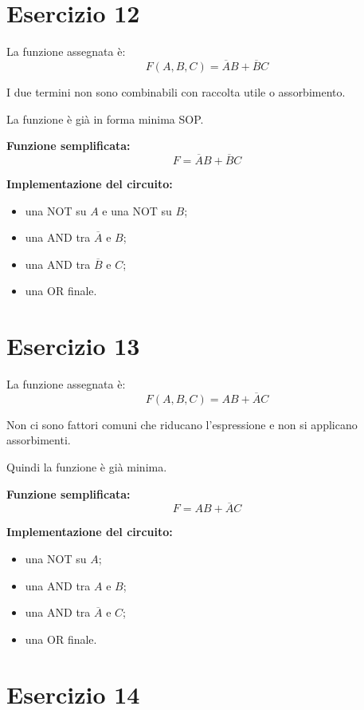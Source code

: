 \documentclass[a4paper,12pt]{article}
\begin{document}
	\bigskip
	
	\section*{Esercizio 12}
	
	La funzione assegnata è:
	\[
	F(A,B,C)=\overline{A}B+\overline{B}C
	\]
	
	I due termini non sono combinabili con raccolta utile o assorbimento.
	
	La funzione è già in forma minima SOP.
	
	\textbf{Funzione semplificata:}
	\[
	\boxed{F=\overline{A}B+\overline{B}C}
	\]
	
	\textbf{Implementazione del circuito:}
	\begin{itemize}
		\item una NOT su $A$ e una NOT su $B$;
		\item una AND tra $\overline{A}$ e $B$;
		\item una AND tra $\overline{B}$ e $C$;
		\item una OR finale.
	\end{itemize}
	
	\bigskip
	
	\section*{Esercizio 13}
	
	La funzione assegnata è:
	\[
	F(A,B,C)=AB+\overline{A}C
	\]
	
	Non ci sono fattori comuni che riducano l'espressione e non si applicano assorbimenti.
	
	Quindi la funzione è già minima.
	
	\textbf{Funzione semplificata:}
	\[
	\boxed{F=AB+\overline{A}C}
	\]
	
	\textbf{Implementazione del circuito:}
	\begin{itemize}
		\item una NOT su $A$;
		\item una AND tra $A$ e $B$;
		\item una AND tra $\overline{A}$ e $C$;
		\item una OR finale.
	\end{itemize}
	
	\bigskip
	
	\section*{Esercizio 14}
	
\end{document}
